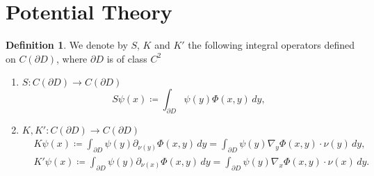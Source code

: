 \documentclass[10pt, a4paper, twoside, openright]{article}
\numberwithin{equation}{section}
\theoremstyle{definition}
\newtheorem{definition}[subsection]{Definition}
\theoremstyle{plain}
\theoremstyle{plain}
\theoremstyle{plain}
\theoremstyle{plain}
\theoremstyle{plain}
\theoremstyle{plain}
\theoremstyle{plain}
\theoremstyle{plain}
\begin{document}
\section{Potential Theory}
\begin{definition}
 We denote by $S$, $K$  and $K'$ the following integral operators defined on $C(\partial D)$, where $\partial D$ is of class $C^2$
 \begin{enumerate}
  \item  $ S: C(\partial D) \to C(\partial D)$
  \begin{equation}
  S\psi(x)\coloneqq\int_{\partial D}\psi(y) \Phi(x,y)\,dy,\label{def:operator-S}
  \end{equation}
  \item  $ K,K':C(\partial D) \to C(\partial D)$
  \begin{align}
  & K\psi(x)\coloneqq\int_{\partial D} \psi(y) \partial_{\nu(y)} \Phi(x, y) \,dy =\int_{\partial D} \psi(y) \nabla_y\Phi(x, y)\cdot\nu(y) \,dy,\label{def:operator-K}\\
  & K'\psi(x)\coloneqq\int_{\partial D} \psi(y) \partial_{\nu(x)} \Phi(x, y) \,dy =\int_{\partial D} \psi(y) \nabla_x\Phi(x, y)\cdot\nu(x) \,dy.\label{def:operator-K'}
  \end{align}
 \end{enumerate}
\end{definition}
\end{document}

